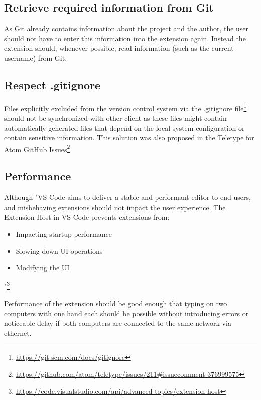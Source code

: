 \subsection{Retrieve required information from Git}

As Git already contains information about the project and the author, the user should not have to enter this information into the extension again. Instead the extension should, whenever possible, read information (such as the current username) from Git.

\subsection{Respect .gitignore}

Files explicitly excluded from the version control system via the .gitignore file\footnote{\href{https://git-scm.com/docs/gitignore}{https://git-scm.com/docs/gitignore}} should not be synchronized with other client as these files might contain automatically generated files that depend on the local system configuration or contain sensitive information. This solution was also proposed in the Teletype for Atom GitHub Issues\footnote{\href{https://github.com/atom/teletype/issues/211\#issuecomment-376999575}{https://github.com/atom/teletype/issues/211\#issuecomment-376999575}}

\subsection{Performance}

Although "VS Code aims to deliver a stable and performant editor to end users, and misbehaving extensions should not impact the user experience. The Extension Host in VS Code prevents extensions from:
\begin{itemize}
    \item Impacting startup performance
    \item Slowing down UI operations
    \item Modifying the UI
\end{itemize}"\footnote{\href{https://code.visualstudio.com/api/advanced-topics/extension-host}{https://code.visualstudio.com/api/advanced-topics/extension-host}}

Performance of the extension should be good enough that typing on two computers with one hand each should be possible without introducing errors or noticeable delay if both computers are connected to the same network via ethernet.

